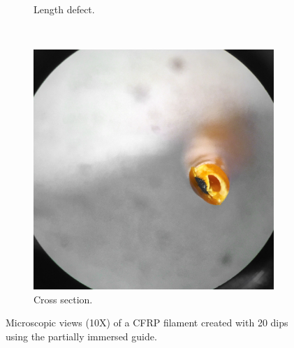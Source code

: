 \begin{figure}[h!]
\begin{subfigure}[b]{0.3\textwidth}
                \caption{Length defect.}
                \label{fig:20-og-defect}
        \end{subfigure}
        ~ %
        \begin{subfigure}[b]{0.3\textwidth}
                \includegraphics[width=\textwidth]{./figures/20-og-end}
                \caption{Cross section.}
                \label{fig:20-og-end}
        \end{subfigure}
        \caption{Microscopic views (10X) of a CFRP filament created with 20 dips using the partially immersed guide.}\label{fig:20-og}
\end{figure}


